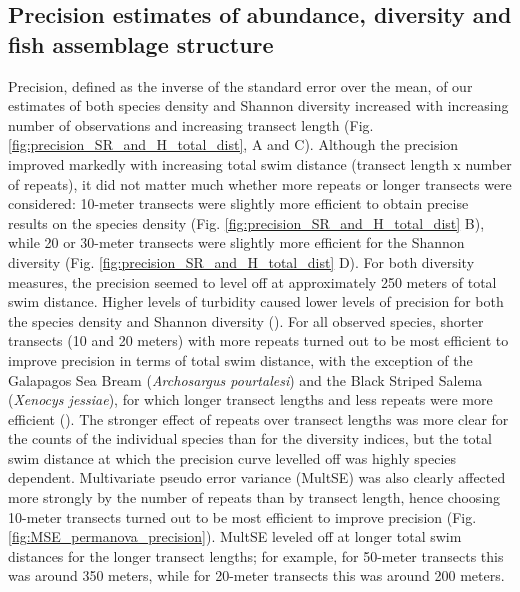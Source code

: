 \documentclass[10pt,letterpaper]{article}
\begin{document}
\subsection{Precision estimates of abundance, diversity and fish assemblage structure}
\label{res:precision}

Precision, defined as the inverse of the standard error over the mean, of our estimates of both species density and Shannon diversity increased with increasing number of observations and increasing transect length (Fig.  \ref{fig:precision_SR_and_H_total_dist}, A and C). Although the precision improved markedly with increasing total swim distance (transect length x number of repeats), it did not matter much whether more repeats or longer transects were considered: 10-meter transects were slightly more efficient to obtain precise results on the species density (Fig.  \ref{fig:precision_SR_and_H_total_dist} B), while 20 or 30-meter transects were slightly more efficient for the Shannon diversity (Fig. \ref{fig:precision_SR_and_H_total_dist} D). For both diversity measures, the precision seemed to level off at approximately 250 meters of total swim distance. Higher levels of turbidity caused lower levels of precision for both the species density and Shannon diversity (). For all observed species, shorter transects (10 and 20 meters) with more repeats turned out to be most efficient to improve precision in terms of total swim distance, with the exception of the Galapagos Sea Bream (\textit{Archosargus pourtalesi}) and the Black Striped Salema (\textit{Xenocys jessiae}), for which longer transect lengths and less repeats were more efficient (). The stronger effect of repeats over transect lengths was more clear for the counts of the individual species than for the diversity indices, but the total swim distance at which the precision curve levelled off was highly species dependent. Multivariate pseudo error variance (MultSE) was also clearly affected more strongly by the number of repeats than by transect length, hence choosing 10-meter transects turned out to be most efficient to improve precision (Fig. \ref{fig:MSE_permanova_precision}).  MultSE leveled off at longer total swim distances for the longer transect lengths; for example, for 50-meter transects this was around 350 meters, while for 20-meter transects this was around 200 meters. 
\end{document}
